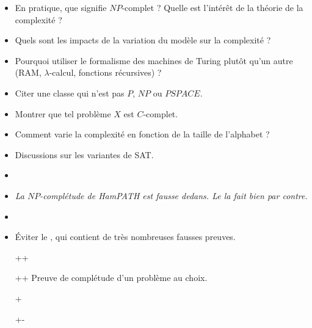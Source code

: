 \documentclass{agregfiche}
\begin{document}
\begin{itemize}
    \item En pratique, que signifie $NP$-complet ? Quelle est
      l'intérêt de la théorie de la complexité ?
    \item Quels sont les impacts de la variation du modèle sur la
    complexité ?
    \item Pourquoi utiliser le formalisme des machines de Turing
        plutôt qu'un autre (RAM, $\lambda$-calcul, fonctions
        récursives) ?
    \item Citer une classe qui n'est pas $P$, $NP$ ou $PSPACE$.
    \item Montrer que tel problème $X$ est $C$-complet.
    \item Comment varie la complexité en fonction de la taille de
    l'alphabet ?
    \item Discussions sur les variantes de SAT.
\end{itemize}

\secreferences

\begin{itemize}
    \item 
    \item 
      \textit{La $NP$-complétude de HamPATH est fausse dedans. Le  la fait bien par contre.}
    \item 
    \item Éviter le , qui contient de très nombreuses
fausses preuves.
\end{itemize}

\secdev

\begin{itemize}
    \item[++] 
    \item[++] Preuve de complétude d'un problème au choix.
    \item[+] 
    \item[+-] 
\end{itemize}
\end{document}
